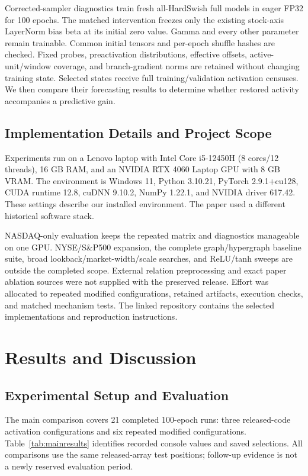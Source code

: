 \documentclass[conference]{IEEEtran}
\begin{document}
Corrected-sampler diagnostics train fresh all-HardSwish full models in eager FP32 for 100 epochs. The matched intervention freezes only the existing stock-axis LayerNorm bias beta at its initial zero value. Gamma and every other parameter remain trainable. Common initial tensors and per-epoch shuffle hashes are checked. Fixed probes, preactivation distributions, effective offsets, active-unit/window coverage, and branch-gradient norms are retained without changing training state. Selected states receive full training/validation activation censuses. We then compare their forecasting results to determine whether restored activity accompanies a predictive gain.

\subsection{Implementation Details and Project Scope}
Experiments run on a Lenovo laptop with Intel Core i5-12450H (8 cores/12 threads), 16 GB RAM, and an NVIDIA RTX 4060 Laptop GPU with 8 GB VRAM. The environment is Windows 11, Python 3.10.21, PyTorch 2.9.1+cu128, CUDA runtime 12.8, cuDNN 9.10.2, NumPy 1.22.1, and NVIDIA driver 617.42. These settings describe our installed environment. The paper used a different historical software stack.

NASDAQ-only evaluation keeps the repeated matrix and diagnostics manageable on one GPU. NYSE/S\&P500 expansion, the complete graph/hypergraph baseline suite, broad lookback/market-width/scale searches, and ReLU/tanh sweeps are outside the completed scope. External relation preprocessing and exact paper ablation sources were not supplied with the preserved release. Effort was allocated to repeated modified configurations, retained artifacts, execution checks, and matched mechanism tests. The linked repository contains the selected implementations and reproduction instructions.

\section{Results and Discussion}
\subsection{Experimental Setup and Evaluation}
The main comparison covers 21 completed 100-epoch runs: three released-code activation configurations and six repeated modified configurations. Table~\ref{tab:mainresults} identifies recorded console values and saved selections. All comparisons use the same released-array test positions; follow-up evidence is not a newly reserved evaluation period.
\end{document}
